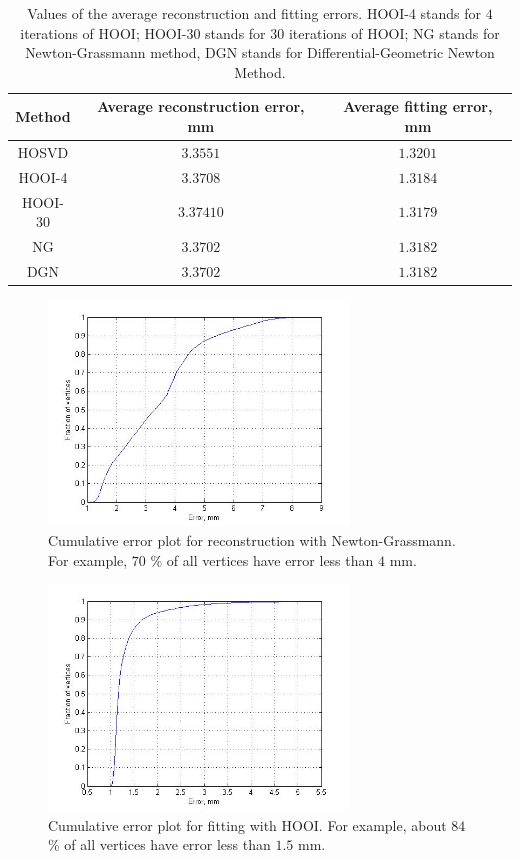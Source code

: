 \begin{table}[h]
\centering
\begin{tabular}{|c|c|c|}
\hline
Method                         & Average reconstruction error, mm & Average fitting error, mm \\ \hline
HOSVD                         & $3.3551 $   &  $ 1.3201 $      \\ \hline
HOOI-4                        & $3.3708$  &  $ 1.3184 $     \\ \hline
HOOI-30                       & $3.37410$   &  $ 1.3179 $     \\ \hline
NG                           & $ 3.3702 $   &  $ 1.3182  $   \\ \hline
DGN                          &  $3.3702 $  &  $ 1.3182 $      \\ \hline
\end{tabular}
\caption{Values of the average reconstruction and fitting errors. HOOI-4 stands for $4$ iterations of HOOI; HOOI-30 stands for $30$ iterations of HOOI; NG stands for Newton-Grassmann method, DGN stands for Differential-Geometric Newton Method.}
\label{avg_fit_rec_error}
\end{table}


\begin{figure}
        \centering
                \includegraphics[width=8cm]{images/cum_error_rec_newgr.jpg}
        \caption{Cumulative error plot for reconstruction with Newton-Grassmann. For example, $70 $ \% of all vertices have error less than $4$ mm.}
        \label{fig:cum_err_fit}
\end{figure}

\begin{figure}
        \centering
                \includegraphics[width=8cm]{images/cum_error_fit_hooi_4.jpg}
        \caption{Cumulative error plot for fitting with HOOI. For example, about $84 $ \% of all vertices have error less than $1.5$ mm.}
        \label{fig:cum_err_fit}
\end{figure}




